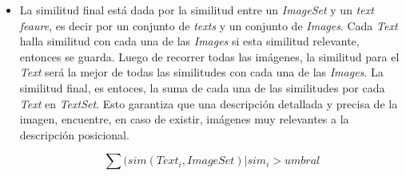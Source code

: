 \begin{itemize}
    \item La similitud final est\'a dada por la similitud entre un \textit{ImageSet} y un \textit{text feaure}, es decir por un conjunto de \textit{texts} y un conjunto de \textit{Images}. Cada \textit{Text} halla similitud con cada una de las \textit{Images} si esta similitud relevante, entonces se guarda. Luego de recorrer todas las im\'agenes, la similitud para el \textit{Text} ser\'a la mejor de todas las similitudes con cada una de las \textit{Images}. La similitud final, es entoces, la suma de cada una de las similitudes por cada \textit{Text} en \textit{TextSet}. Esto garantiza que una descripci\'on detallada y precisa de la imagen, encuentre, en caso de existir, im\'agenes muy relevantes a la descripci\'on posicional.
        
        \[\sum(sim(Text_i, ImageSet) | sim_i>umbral\]
    

\end{itemize}

